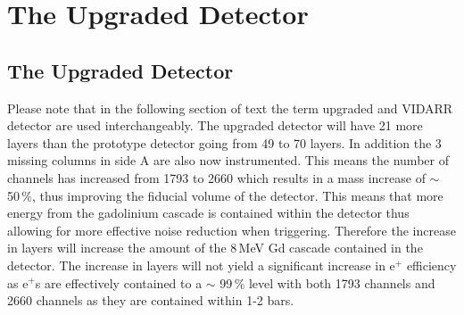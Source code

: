 \chapter{The Upgraded Detector} \label{Chp:TheUpgradedDetector}

\ifpdf
    \graphicspath{{Chapter3/Figs/Raster/}{Chapter3/Figs/PDF/}{Chapter3/Figs/}}
\else
    \graphicspath{{Chapter3/Figs/Vector/}{Chapter3/Figs/}}
\fi

\section{The Upgraded Detector}\label{sec:theUpgradedDetector}
Please note that in the following section of text the term upgraded and VIDARR detector are used interchangeably. The upgraded detector will have 21 more layers than the prototype detector going from 49 to 70 layers. In addition the 3 missing columns in side A are also now instrumented. This means the number of channels has increased from 1793 to 2660 which results in a mass increase of $\sim$ 50\,\%, thus improving the fiducial volume of the detector. This means that more energy from the gadolinium cascade is contained within the detector thus allowing for more effective noise reduction when triggering. Therefore the increase in layers will increase the amount of the 8\,MeV Gd cascade contained in the detector. The increase in layers will not yield a significant increase in e$^+$ efficiency as e$^+$s are effectively contained to a $\sim$ 99\,\% level with both 1793 channels and 2660 channels as they are contained within 1-2 bars.
